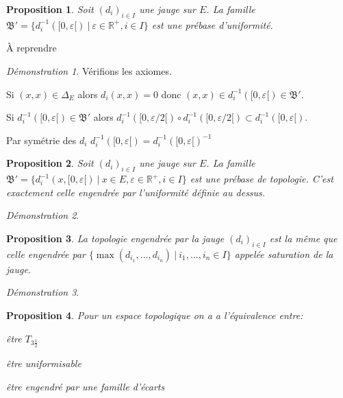 \documentclass[a4paper, 11pt, french]{book}
\newenvironment{itemise}{\itemize}{\enditemize}
\let\colour=\color
\theoremstyle{plain} %
\newtheorem{proposition}{Proposition}
\theoremstyle{definition} %
\theoremstyle{remark} %
\newtheorem*{demonstration}{Démonstration}
\newcommand{\1}{\mathds{1}}
\newcommand{\inv}[1]{#1^{-1}}
\newcommand{\R}{\mathbb{R}}
\renewcommand{\frak}[1]{\mathfrak{#1}}
\newcommand\ens[2]{\{#1 \ |\ #2\}}
\begin{document}
\begin{proposition}
	Soit $(d_i)_{i\in I}$ une jauge sur $E$.
	La famille $\frak{B}'=\ens{\inv{d_i}([0, \varepsilon[)}{\varepsilon\in\R^+, i\in I}$ est une prébase d'uniformité.
\end{proposition}

{\colour{red} À reprendre}

\begin{demonstration}
	Vérifions les axiomes.
	\begin{itemise}
		\item Si $(x, x)\in\Delta_E$ alors $d_i(x, x)=0$ donc $(x, x)\in\inv{d_i}([0, \varepsilon[)\in\frak{B}'$.
		\item Si $\inv{d_i}([0, \varepsilon[)\in\frak{B}'$ alors $\inv{d_i}([0, \varepsilon/2[)\circ \inv{d_i}([0, \varepsilon/2[)\subset\inv{d_i}([0, \varepsilon[)$.
		\item Par symétrie des $d_i$ $\inv{d_i}([0, \varepsilon[)=\inv{\inv{d_i}([0, \varepsilon[)}$
	\end{itemise}
\end{demonstration}

\begin{proposition}
	Soit $(d_i)_{i\in I}$ une jauge sur $E$.
	La famille $\frak{B}'=\ens{\inv{d_i}(x, [0, \varepsilon[)}{x\in E, \varepsilon\in\R^+, i\in I}$ est une prébase de topologie.
	C'est exactement celle engendrée par l'uniformité définie au dessus.
\end{proposition}

\begin{demonstration}
	\colour{red}{À démontrer}
\end{demonstration}

\begin{proposition}
	La topologie engendrée par la jauge $(d_i)_{i\in I}$ est la même que celle engendrée par $\ens{\max(d_{i_1}, ..., d_{i_n})}{i_1, ..., i_n\in I}$ appelée saturation de la jauge.
\end{proposition}

\begin{demonstration}
	\colour{red}{À démontrer}
\end{demonstration}

\begin{proposition}
	Pour un espace topologique on a a l'équivalence entre:
	\begin{itemise}
		\item être $T_{3\frac{1}{2}}$
		\item être uniformisable
		\item être engendré par une famille d'écarts
	\end{itemise}
\end{proposition}
\end{document}
